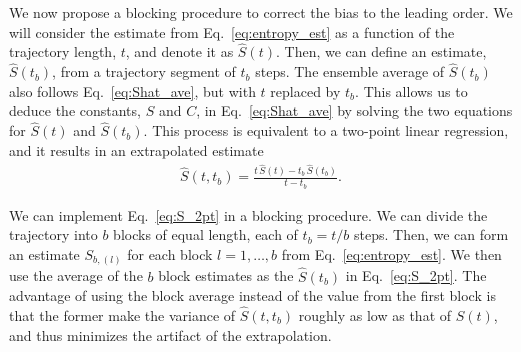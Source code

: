 \documentclass[reprint, superscriptaddress]{revtex4-1}
\begin{document}
We now propose a blocking procedure to correct the bias to the leading order.
%
We will consider the estimate from Eq.~\eqref{eq:entropy_est}
as a function of the trajectory length, $t$, and denote it as $\hat S(t)$.
%
Then, we can define an estimate, $\hat S(t_b)$,
from a trajectory segment of $t_b$ steps.
%
The ensemble average of $\hat S(t_b)$ also follows
Eq.~\eqref{eq:Shat_ave}, but with $t$ replaced by $t_b$.
%
This allows us to deduce the constants, $S$ and $C$, in Eq.~\eqref{eq:Shat_ave}
by solving the two equations for $\hat S(t)$ and $\hat S(t_b)$.
%
This process is equivalent to a two-point linear regression,
and it results in an extrapolated estimate
%
\begin{align}
    \hat S(t, t_b)
    =
    \frac{ t \, \hat S(t) - t_b \, \hat S(t_b) }
         { t - t_b }
    .
    \label{eq:S_2pt}
\end{align}

We can implement Eq.~\eqref{eq:S_2pt} in a blocking procedure.
%
We can divide the trajectory into $b$ blocks of equal length,
each of $t_b = t/b$ steps.
%
Then, we can form an estimate $S_{b, (l)}$ for each block $l = 1, \dots, b$ from Eq.~\eqref{eq:entropy_est}.
%
We then use the average of the $b$ block estimates
as the $\hat S(t_b)$ in Eq.~\eqref{eq:S_2pt}.
%
The advantage of using the block average instead of
the value from the first block is that
the former make the variance of $\hat S(t, t_b)$
roughly as low as that of $\hat S(t)$,
and thus minimizes the artifact of the extrapolation.


%
\end{document}
